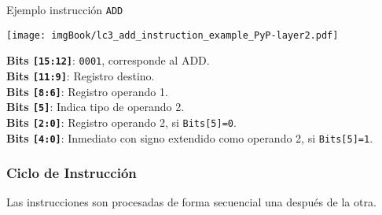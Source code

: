 \documentclass[aspectratio=169]{beamer}
\begin{document}
\begin{frame}[t,fragile]
\begin{textblock}{53}
{\begin{block}{\footnotesize Ejemplo instrucción \texttt{ADD}}
\begin{center}
    \texttt{[image: imgBook/lc3\_add\_instruction\_example\_PyP-layer2.pdf]}
    \end{center}
    \textcolor{naranjauca}{\textbf{Bits \texttt{[15:12]}}}: \texttt{0001}, corresponde al ADD.\\
    \textcolor{naranjauca}{\textbf{Bits \texttt{[11:9]}}}: Registro destino.\\
    \textcolor{naranjauca}{\textbf{Bits \texttt{[8:6]}}}: Registro operando 1.\\
    \textcolor{naranjauca}{\textbf{Bits \texttt{[5]}}}: Indica tipo de operando 2.\\
    \textcolor{naranjauca}{\textbf{Bits \texttt{[2:0]}}}: Registro operando 2, si \texttt{Bits[5]=0}.\\
    \textcolor{naranjauca}{\textbf{Bits \texttt{[4:0]}}}: Inmediato con signo extendido como operando 2, si \texttt{Bits[5]=1}.\\
    \end{block}
    }
    \end{textblock}
\end{frame}

\begin{frame}[t,fragile]
    \frametitle{Ciclo de Instrucción}
    Las instrucciones son procesadas de forma secuencial una después de la otra.\\
    \bigskip
\end{frame}
\end{document}
